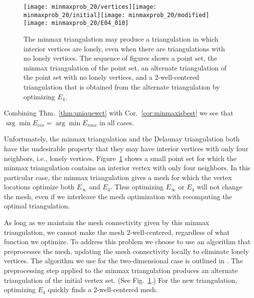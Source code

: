 \documentclass[final]{siamltex}
\begin{document}
\begin{figure}
  \centering
  \texttt{[image: minmaxprob\_20/vertices]}\hspace{10pt}\texttt{[image: minmaxprob\_20/initial]}\hspace{10pt}\texttt{[image: minmaxprob\_20/modified]}\hspace{10pt}\texttt{[image: minmaxprob\_20/E04\_010]}\caption{The minmax triangulation may produce a triangulation in
    which interior vertices are lonely, even when there are
    triangulations with no lonely vertices.  The sequence of figures
    shows a point set, the minmax triangulation of the point set, an
    alternate triangulation of the point set with no lonely vertices,
    and a $2$-well-centered triangulation that is obtained from the
    alternate triangulation by optimizing $E_{4}$.}
  \label{fig:minmaxproblem}
\end{figure}

Combining Thm.~\ref{thm:uniquewct} with Cor.~\ref{cor:minmaxisbest} we
see that $\arg\min E_{cos} = \arg\min E_{max}$ in all cases.

Unfortunately, the minmax triangulation and the Delaunay triangulation
both have the undesirable property that they may have interior
vertices with only four neighbors, i.e., lonely vertices.
Figure~\ref{fig:minmaxproblem} shows a small point set for which the
minmax triangulation contains an interior vertex with only four
neighbors.  In this particular case, the minmax triangulation gives a
mesh for which the vertex locations optimize both $E_{\infty}$ and
$E_{4}$.  Thus optimizing $E_{\infty}$ or $E_{4}$ will not change the
mesh, even if we interleave the mesh optimization with recomputing the
optimal triangulation.

As long as we maintain the mesh connectivity given by this minmax
triangulation, we cannot make the mesh $2$-well-centered, regardless
of what function we optimize.  To address this problem we choose to
use an algorithm that preprocesses the mesh, updating the mesh
connectivity locally to eliminate lonely vertices.  The algorithm we
use for the two-dimensional case is outlined in \cite{VaHiGuRa2007}.
The preprocessing step applied to the minmax triangulation produces an
alternate triangulation of the initial vertex set.  (See
Fig.~\ref{fig:minmaxproblem}.)  For the new triangulation, optimizing
$E_{4}$ quickly finds a $2$-well-centered mesh.
\end{document}
